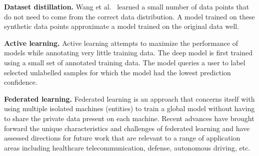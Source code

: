 \documentclass[12pt, letterpaper]{article}
\begin{document}
\noindent \textbf{Dataset distillation.} Wang et al.~\cite{datasetdistillation} learned a small number of data points that do not need to come from the correct data distribution.  A model trained on these synthetic data points approximate a model trained on the original data well.

\noindent \textbf{Active learning.} Active learning \cite{al1,al2,al3,al4} attempts to maximize the performance of models while annotating very little training data. The deep model is first trained using a small set of annotated training data.  The model queries a user to label selected unlabelled samples for which the model had the lowest prediction confidence.

\noindent \textbf{Federated learning.} Federated learning is an approach that concerns itself with using multiple isolated machines (entities) to train a global model without having to share the private data present on each machine. Recent advances \cite{fed1,fed2,fed3,fed4} have brought forward the unique characteristics and challenges of federated learning and have assessed directions for future work that are relevant to a range of application areas including healthcare telecommunication, defense, autonomous driving, etc.


{\small


}
\end{document}
